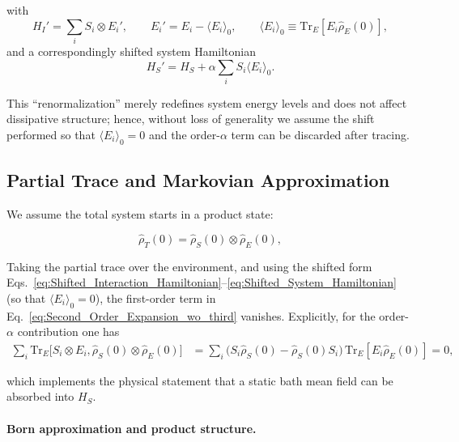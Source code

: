 \noindent
with
\begin{equation}
	H_I' = \sum_i S_i \otimes E_i', \qquad E_i' = E_i - \langle E_i \rangle_0, \qquad \langle E_i \rangle_0 \equiv \mathrm{Tr}_E[E_i \hat{\rho}_E(0)],
	\label{eq:Shifted_Interaction_Hamiltonian}
\end{equation}
and a correspondingly shifted system Hamiltonian
\begin{equation}
	H_S' = H_S + \alpha \sum_i S_i \langle E_i \rangle_0.
	\label{eq:Shifted_System_Hamiltonian}
\end{equation}

\noindent
This ``renormalization'' merely redefines system energy levels and does not affect dissipative structure; hence, without loss of generality we assume the shift performed so that $\langle E_i \rangle_0 = 0$ and the order-$\alpha$ term can be discarded after tracing.

\subsection{Partial Trace and Markovian Approximation}

\noindent
We assume the total system starts in a product state:

\begin{equation}
	\hat{\rho}_T(0) = \hat{\rho}_S(0) \otimes \hat{\rho}_E(0),
	\label{eq:Initial_Product_State}
\end{equation}

\noindent
Taking the partial trace over the environment, and using the shifted form Eqs.~\eqref{eq:Shifted_Interaction_Hamiltonian}--\eqref{eq:Shifted_System_Hamiltonian} (so that $\langle E_i \rangle_0 = 0$), the first-order term in Eq.~\eqref{eq:Second_Order_Expansion_wo_third} vanishes. Explicitly, for the order-$\alpha$ contribution one has
\begin{align}
	\sum_i \mathrm{Tr}_E\big[ S_i \otimes E_i, \hat{\rho}_S(0) \otimes \hat{\rho}_E(0)\big]
	 & = \sum_i \big(S_i \hat{\rho}_S(0) - \hat{\rho}_S(0) S_i\big) \, \mathrm{Tr}_E[E_i \hat{\rho}_E(0)] = 0,
	\label{eq:Trace_Relation_first_part}
\end{align}

\noindent
which implements the physical statement that a static bath mean field can be absorbed into $H_S$.

\paragraph{Born approximation and product structure.}

